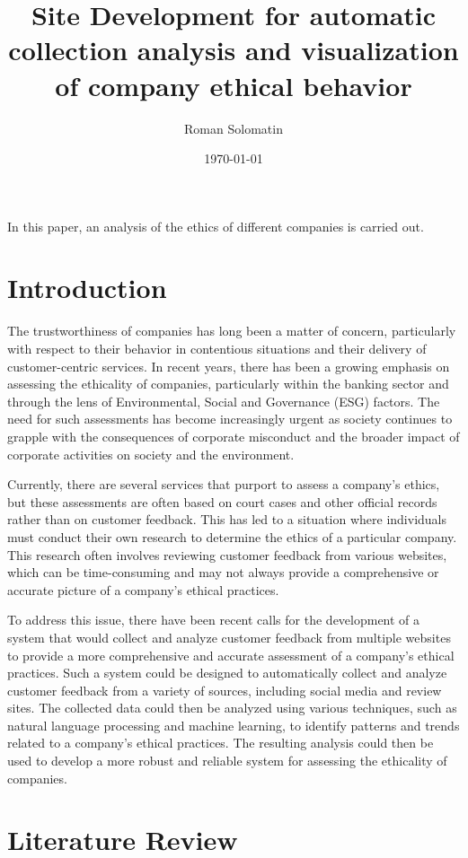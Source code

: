 \documentclass[PI]{ProjectProposal}
\author{Roman Solomatin}
\date{\today}
\title{Site Development for automatic collection analysis and visualization of company ethical behavior}
\begin{document}
\maketitle
In this paper, an analysis of the ethics of different companies is carried out.

\chapter{Introduction}
\label{sec:org8702bd0}
The trustworthiness of companies has long been a matter of concern, particularly with respect to their behavior in contentious situations and their delivery of customer-centric services. In recent years, there has been a growing emphasis on assessing the ethicality of companies\autocites{mure_esg_2021}[][]{miralles-quiros_esg_2019}[][]{climent_ethical_2018}, particularly within the banking sector and through the lens of Environmental, Social and Governance (ESG) factors. The need for such assessments has become increasingly urgent as society continues to grapple with the consequences of corporate misconduct and the broader impact of corporate activities on society and the environment.

Currently, there are several services that purport to assess a company's ethics, but these assessments are often based on court cases and other official records rather than on customer feedback. This has led to a situation where individuals must conduct their own research to determine the ethics of a particular company. This research often involves reviewing customer feedback from various websites, which can be time-consuming and may not always provide a comprehensive or accurate picture of a company's ethical practices.

To address this issue, there have been recent calls for the development of a system that would collect and analyze customer feedback from multiple websites to provide a more comprehensive and accurate assessment of a company's ethical practices. Such a system could be designed to automatically collect and analyze customer feedback from a variety of sources, including social media and review sites. The collected data could then be analyzed using various techniques, such as natural language processing and machine learning, to identify patterns and trends related to a company's ethical practices. The resulting analysis could then be used to develop a more robust and reliable system for assessing the ethicality of companies.
\chapter{Literature Review}
\label{sec:org97e72d0}
\end{document}
